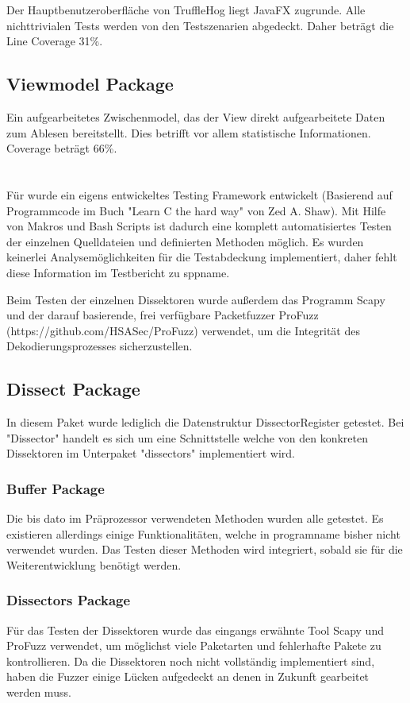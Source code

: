 Der Hauptbenutzeroberfläche von TruffleHog liegt JavaFX zugrunde. Alle nichttrivialen Tests werden von den Testszenarien abgedeckt. Daher beträgt die Line Coverage 31\%.

\subsection{Viewmodel Package}

Ein aufgearbeitetes Zwischenmodel, das der View direkt aufgearbeitete Daten zum Ablesen bereitstellt. Dies betrifft vor allem statistische Informationen. Coverage beträgt 66\%.

\section{\sppname}
Für \sppname wurde ein eigens entwickeltes Testing Framework entwickelt (Basierend auf Programmcode im Buch "Learn C the hard way" von Zed A. Shaw). Mit Hilfe von Makros und Bash Scripts ist dadurch eine komplett automatisiertes Testen der einzelnen Quelldateien und definierten Methoden möglich. Es wurden keinerlei Analysemöglichkeiten für die Testabdeckung implementiert, daher fehlt diese Information im Testbericht zu \gls{sppname}.

Beim Testen der einzelnen Dissektoren wurde außerdem das Programm Scapy und der darauf basierende, frei verfügbare Packetfuzzer ProFuzz (https://github.com/HSASec/ProFuzz) verwendet, um die Integrität des Dekodierungsprozesses sicherzustellen.

	\subsection{Dissect Package}
	In diesem Paket wurde lediglich die Datenstruktur DissectorRegister getestet. Bei "Dissector" handelt es sich um eine Schnittstelle welche von den konkreten Dissektoren im Unterpaket "dissectors" implementiert wird.
	
		\subsubsection{Buffer Package}
		Die bis dato im Präprozessor verwendeten Methoden wurden alle getestet. Es existieren allerdings einige Funktionalitäten, welche in \gls{programname} bisher nicht verwendet wurden. Das Testen dieser Methoden wird integriert, sobald sie für die Weiterentwicklung benötigt werden.
		
		\subsubsection{Dissectors Package}
		Für das Testen der Dissektoren wurde das eingangs erwähnte Tool Scapy und ProFuzz verwendet, um möglichst viele Paketarten und fehlerhafte Pakete zu kontrollieren. Da die Dissektoren noch nicht vollständig implementiert sind, haben die Fuzzer einige Lücken aufgedeckt an denen in Zukunft gearbeitet werden muss.
		
